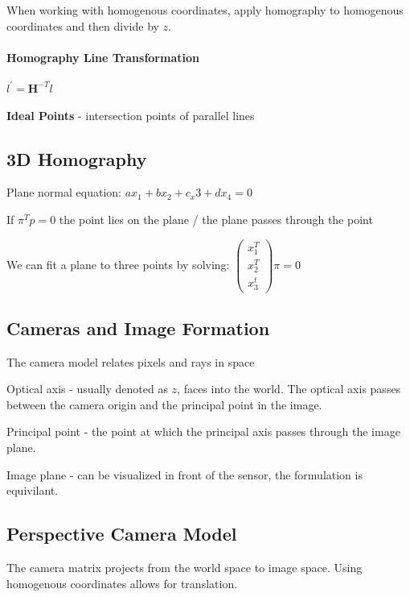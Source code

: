 When working with homogenous coordinates, apply homography to homogenous coordinates and then divide by $z$.




\paragraph{Homography Line Transformation}

$l^\prime = \mathbf{H}^{-T} l$

\textbf{Ideal Points} - intersection points of parallel lines

\subsection{3D Homography}

Plane normal equation: $ax_1 + bx_2 + c_x3 + d x_4 = 0$ 

If $\pi^T p = 0$ the point lies on the plane / the plane passes through the point

We can fit a plane to three points by solving:
$\left( \begin{matrix} x_1^T \\ x_2^T \\ x_3^t \end{matrix} \right) \pi = 0 $

\subsection{Cameras and Image Formation}

The camera model relates pixels and rays in space

Optical axis - usually denoted as $z$, faces into the world.
The optical axis passes between the camera origin and the principal point in the image.

Principal point - the point at which the principal axis passes through the image plane.

Image plane - can be visualized in front of the sensor, the formulation is equivilant.


\subsection{Perspective Camera Model}
The camera matrix projects from the world space to image space. Using homogenous coordinates allows for translation.

